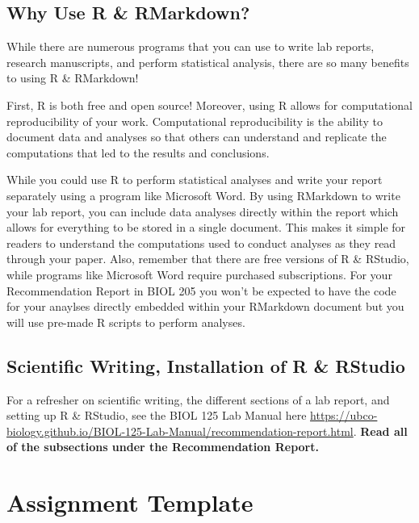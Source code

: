 \documentclass[
]{book}
\begin{document}
\hypertarget{why-use-r-rmarkdown}{%
\subsection*{Why Use R \& RMarkdown?}\label{why-use-r-rmarkdown}}

While there are numerous programs that you can use to write lab reports, research manuscripts, and perform statistical analysis, there are so many benefits to using R \& RMarkdown!

First, R is both free and open source! Moreover, using R allows for computational reproducibility of your work. Computational reproducibility is the ability to document data and analyses so that others can understand and replicate the computations that led to the results and conclusions.

While you could use R to perform statistical analyses and write your report separately using a program like Microsoft Word. By using RMarkdown to write your lab report, you can include data analyses directly within the report which allows for everything to be stored in a single document. This makes it simple for readers to understand the computations used to conduct analyses as they read through your paper. Also, remember that there are free versions of R \& RStudio, while programs like Microsoft Word require purchased subscriptions. For your Recommendation Report in BIOL 205 you won't be expected to have the code for your anaylses directly embedded within your RMarkdown document but you will use pre-made R scripts to perform analyses.

\hypertarget{scientific-writing-installation-of-r-rstudio}{%
\subsection*{Scientific Writing, Installation of R \& RStudio}\label{scientific-writing-installation-of-r-rstudio}}

For a refresher on scientific writing, the different sections of a lab report, and setting up R \& RStudio, see the BIOL 125 Lab Manual here \url{https://ubco-biology.github.io/BIOL-125-Lab-Manual/recommendation-report.html}. \textbf{Read all of the subsections under the Recommendation Report.}

\hypertarget{assignment-template}{%
\section*{Assignment Template}\label{assignment-template}}
\end{document}
